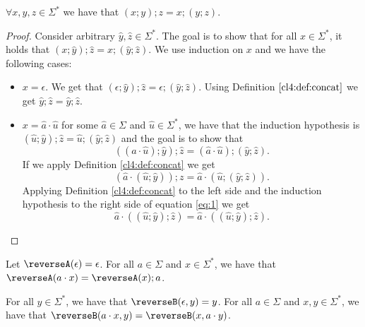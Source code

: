 \begin{theorem}[Associativity]
\label{cl4:thrm:assoc}
$\forall x,y,z \in \Sigma^*$ we have that $(x;y);z = x;(y;z)$.
    
\end{theorem}
\begin{proof} Consider arbitrary $\hat{y}, \hat{z} \in \Sigma^*$. The goal is to show that for all $x \in \Sigma^*$, it holds that $(x; \hat{y});\hat{z} = x ; (\hat{y}; \hat{z})$. We use induction on $x$ and we have the following cases:
    \begin{itemize}
        \item \textbf{$x = \epsilon$}. We get that $(\epsilon; \hat{y}); \hat{z} = \epsilon; (\hat{y}; \hat{z})$. Using Definition $\ref{cl4:def:concat}$ we get $\hat{y};\hat{z} = \hat{y};\hat{z}$.
        \item \textbf{$x = \hat{a}\cdot \hat{u}$} for some $\hat a \in \Sigma$ and $\hat{u} \in \Sigma^*$, we have that the induction hypothesis is $(\hat{u}; \hat{y}); \hat{z} = \hat{u};(\hat{y}; \hat{z})$ and the goal is to show that 
        \begin{equation}
            ((\hat{a}\cdot \hat{u}); \hat{y}); \hat{z} = (\hat{a} \cdot \hat{u}); (\hat{y}; \hat{z}).
        \end{equation}  
        If we apply Definition \ref{cl4:def:concat} we get
        \begin{equation}
            (\hat{a}\cdot (\hat{u}; \hat{y})); z = \hat{a}\cdot(\hat{u}; (\hat{y}; \hat{z})).
            \label{eq:1}
        \end{equation}
        Applying Definition \ref{cl4:def:concat} to the left side and the induction hypothesis to the right side of equation \ref{eq:1} we get
        \begin{equation}
            \hat{a} \cdot ((\hat{u}; \hat{y}); \hat{z}) = \hat{a} \cdot ((\hat{u}; \hat{y}); \hat{z}). 
        \end{equation}
    \end{itemize}
\end{proof}

\begin{definition}[$\reverseA$]
Let $\reverseA(\epsilon) = \epsilon$.
For all $a \in \Sigma$ and $x \in \Sigma^*$, we have that $\reverseA(a\cdot x) = \reverseA(x); a$.
    \label{cl4:def:rev1}
\end{definition}


\begin{definition}[$\reverseB$]
\label{cl4:def:rev2}
For all $y\in \Sigma^*$, we have that $\reverseB(\epsilon, y) = y$.
For all $a\in \Sigma$ and $x, y\in \Sigma^*$, we have that $\reverseB(a \cdot x, y) = \reverseB(x, a\cdot y)$.
\end{definition}




